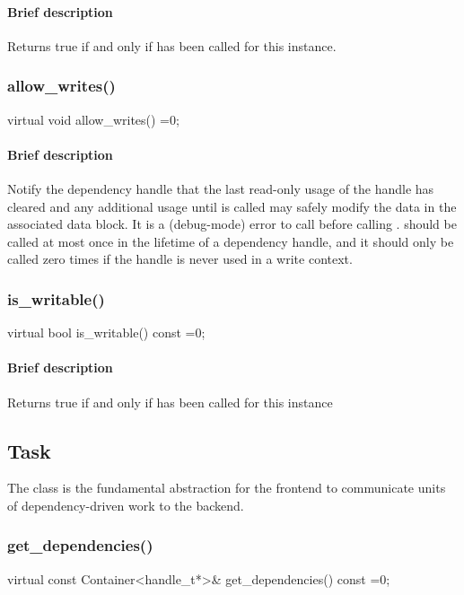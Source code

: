 \paragraph{Brief description} Returns true if and only if  has been called for this instance.


\subsubsection{allow\_writes()}
\begin{CppCode}
    virtual void
    allow_writes() =0;
\end{CppCode}

\paragraph{Brief description} Notify the dependency handle that the last read-only usage of the handle has cleared
       and any additional usage until  is called may safely modify the
       data in the associated data block.
       It is a (debug-mode) error to call  before calling .
        should be called at most once in the lifetime of a dependency handle, and
       it should only be called zero times if the handle is never used in a write context.


\subsubsection{is\_writable()}
\begin{CppCode}
    virtual bool
    is_writable() const =0;
\end{CppCode}

\paragraph{Brief description} Returns true if and only if  has been called for this instance
     

\subsection{{Task}}
The class  is the fundamental abstraction for the frontend to communicate units of
  dependency-driven work to the backend.


\subsubsection{get\_dependencies()}
\begin{CppCode}
    virtual
    const Container<handle_t*>&
    get_dependencies() const =0;
\end{CppCode}

